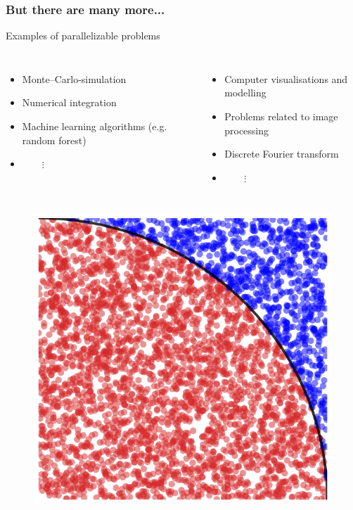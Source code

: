 \begin{frame}
\frametitle{But there are many more...}

\begin{block}{Examples of parallelizable problems}
	\begin{columns}
		\begin{itemize}
			\item Monte--Carlo-simulation
			\item Numerical integration
			\item Machine learning algorithms (e.g. random forest)
			\item[] $\qquad \vdots$
		\end{itemize}
		
		\begin{itemize}
			\item Computer visualisations and modelling
			\item Problems related to image processing
			\item Discrete Fourier transform
			\item[] $\qquad \vdots$
		\end{itemize}
	\end{columns}
\end{block}

\begin{columns}
	\column{0.3\linewidth}
	\begin{figure}
		\includegraphics[width=\textwidth]{img/monte_carlo.png}
	\end{figure}	
	

\end{columns}
\end{frame}

